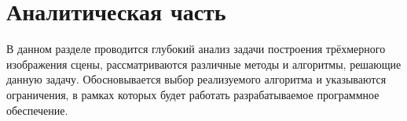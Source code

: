 \chapter{Аналитическая часть}

В данном разделе проводится глубокий анализ задачи построения трёхмерного изображения сцены, рассматриваются различные методы и алгоритмы, решающие данную задачу. Обосновывается выбор реализуемого алгоритма и указываются ограничения, в рамках которых будет работать разрабатываемое программное обеспечение.

%
%
%
%
%
%
